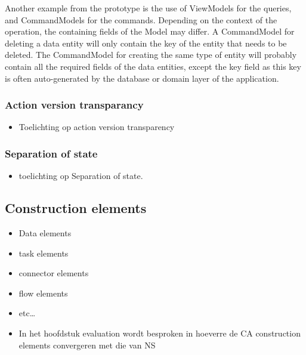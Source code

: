 Another example from the prototype is the use of ViewModels for the queries, and
CommandModels for the commands. Depending on the context of the operation, the containing
fields of the Model may differ. A CommandModel for deleting a data entity will only
contain the key of the entity that needs to be deleted. The CommandModel for creating the
same type of entity will probably contain all the required fields of the data entities,
except the key field as this key is often auto-generated by the database or
domain layer of the application. 

\subsubsection{Action version transparancy}
\begin{itemize}
    \item Toelichting op action version transparency
\end{itemize}

\subsubsection{Separation of state}
\begin{itemize}
    \item toelichting op Separation of state.
\end{itemize}

\subsection{Construction elements}
\begin{itemize}
    \item Data elements
    \item task elements
    \item connector elements
    \item flow elements
    \item etc\dots
    \item In het hoofdstuk evaluation wordt
    besproken in hoeverre de CA construction elements convergeren met die van NS
\end{itemize}
